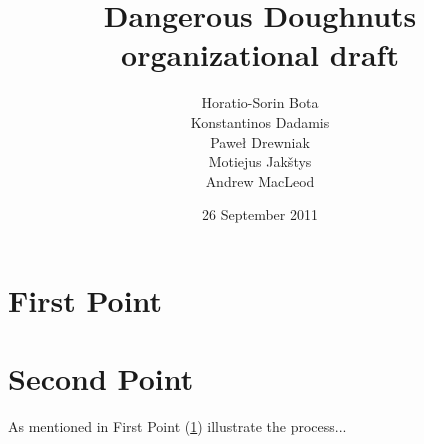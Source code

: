 \documentclass{report}
\begin{document}
\title{Dangerous Doughnuts organizational draft}
\author{Horatio-Sorin Bota \\
		Konstantinos Dadamis \\
		Paweł Drewniak \\
		Motiejus Jakštys \\
		Andrew MacLeod}

\date{26 September 2011}
\maketitle


\section{First Point}
\label{firstpoint}

\section{Second Point}
\label{secondpoint}

As mentioned in First Point (\ref{firstpoint}) illustrate the
process...



\end{document}
